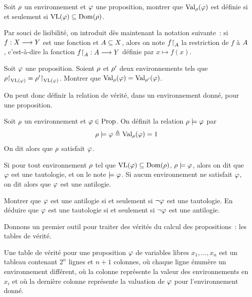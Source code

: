 \begin{exercise}
  Soit $\rho$ un environnement et $\varphi$ une proposition, montrer que
  $\operatorname{Val}_{\rho}(\varphi)$ est définie si et seulement si
  $\operatorname{VL}(\varphi)\subseteq \operatorname{Dom}(\rho)$.
\end{exercise}

\begin{notation}
  Par souci de lisibilité, on introduit dès maintenant la notation suivante~:
  si $f : \displaystyle X \longrightarrow Y$ est une fonction et $A \subseteq X$,
  alors on note $f\mathbin{\upharpoonright}_{A}$ la restriction de $f$ à $A$,
  c'est-à-dire la fonction $f\mathbin{\upharpoonright}_{A} : \displaystyle A \longrightarrow Y$
  définie par $x \mapsto f(x)$.
\end{notation}

\begin{exercise}\label{exo.val.VL}
  Soit $\varphi$ une proposition. Soient $\rho$ et $\rho'$ deux environnements
  tels
  que $\rho\mathbin{\upharpoonright}_{\operatorname{VL}(\varphi)}=\rho'\mathbin{\upharpoonright}_{\operatorname{VL}(\varphi)}$. Montrer que
  $\operatorname{Val}_{\rho}(\varphi)=\operatorname{Val}_{\rho'}(\varphi)$.
\end{exercise}

On peut donc définir la relation de vérité, dans un environnement donné, pour
une proposition.

\begin{definition}[Satisfaction]
  Soit $\rho$ un environnement et $\varphi\in\operatorname{Prop}$. On définit la relation
  $\rho\models \varphi$ par
  \[\rho\models \varphi \triangleq \operatorname{Val}_{\rho}(\varphi) = 1\]
  On dit alors que $\rho$ satisfait $\varphi$.

  Si pour tout environnement $\rho$ tel que $\operatorname{VL}(\varphi)\subseteq\operatorname{Dom}(\rho)$,
  $\rho\models \varphi$, alors on dit que $\varphi$ est une
  tautologie, et on le note
  $\models \varphi$. Si aucun environnement ne satisfait $\varphi$, on dit alors
  que $\varphi$ est une antilogie.
\end{definition}

\begin{exercise}
  Montrer que $\varphi$ est une antilogie si et seulement si $\lnot \varphi$
  est une
  tautologie. En déduire que $\varphi$ est une tautologie si et seulement si
  $\lnot \varphi$
  est une antilogie.
\end{exercise}

Donnons un premier outil pour traiter des vérités du calcul des propositions~:
les tables de vérité.

\begin{definition}
  Une table de vérité pour une proposition $\varphi$ de variables libres
  $x_1,\ldots,x_n$ est un tableau contenant $2^n$ lignes et $n+1$ colonnes, où
  chaque ligne énumère un environnement différent, où la
   colonne représente la valeur des environnements en
  $x_i$ et où la dernière colonne représente la valuation de $\varphi$ pour
  l'environnement donné.
\end{definition}

